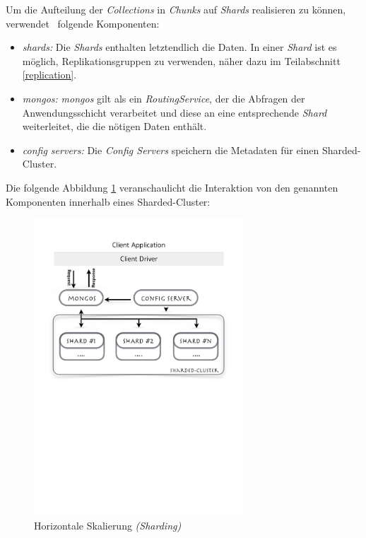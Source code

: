 Um die Aufteilung der \textit{Collections} in \textit{Chunks} auf \textit{Shards} realisieren zu können, verwendet \mongo\ folgende Komponenten:
\begin{itemize}
\item \textit{shards:} Die \textit{Shards} enthalten letztendlich die Daten. In einer \textit{Shard} ist es möglich, Replikationsgruppen zu verwenden, näher dazu im Teilabschnitt \ref{replication}.
\item \textit{mongos:} \textit{mongos} gilt als ein \textit{RoutingService}, der die Abfragen der Anwendungsschicht verarbeitet und diese an eine entsprechende \textit{Shard} weiterleitet, die die nötigen Daten enthält.
\item \textit{config servers:} Die \textit{Config Servers}  speichern die Metadaten für einen Sharded-Cluster. 
\end{itemize}
Die folgende Abbildung \ref{img:shardedCluster} veranschaulicht die Interaktion von den genannten Komponenten innerhalb eines Sharded-Cluster:
\begin{figure}[H]
\centering
\includegraphics[trim = 0mm 139mm 0mm 23mm, clip, width=0.7\textwidth]{resources/replicaSet/shardedCluster}
\caption[Horizontale Skalierung \textit{(Sharding)}]{Horizontale Skalierung \textit{(Sharding)}}
\label{img:shardedCluster}
\end{figure}

